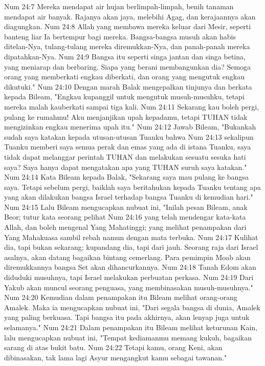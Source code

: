 Num 24:7  Mereka mendapat air hujan berlimpah-limpah, benih tanaman mendapat air banyak. Rajanya akan jaya, melebihi Agag, dan kerajaannya akan diagungkan.
Num 24:8  Allah yang membawa mereka keluar dari Mesir, seperti banteng liar Ia bertempur bagi mereka. Bangsa-bangsa musuh akan habis ditelan-Nya, tulang-tulang mereka diremukkan-Nya, dan panah-panah mereka dipatahkan-Nya.
Num 24:9  Bangsa itu seperti singa jantan dan singa betina, yang meniarap dan berbaring. Siapa yang berani membangunkan dia? Semoga orang yang memberkati engkau diberkati, dan orang yang mengutuk engkau dikutuki."
Num 24:10  Dengan marah Balak mengepalkan tinjunya dan berkata kepada Bileam, "Engkau kupanggil untuk mengutuk musuh-musuhku, tetapi mereka malah kauberkati sampai tiga kali.
Num 24:11  Sekarang kau boleh pergi, pulang ke rumahmu! Aku menjanjikan upah kepadamu, tetapi TUHAN tidak mengizinkan engkau menerima upah itu."
Num 24:12  Jawab Bileam, "Bukankah sudah saya katakan kepada utusan-utusan Tuanku bahwa
Num 24:13  sekalipun Tuanku memberi saya semua perak dan emas yang ada di istana Tuanku, saya tidak dapat melanggar perintah TUHAN dan melakukan sesuatu sesuka hati saya? Saya hanya dapat mengatakan apa yang TUHAN suruh saya katakan."
Num 24:14  Kata Bileam kepada Balak, "Sekarang saya mau pulang ke bangsa saya. Tetapi sebelum pergi, baiklah saya beritahukan kepada Tuanku tentang apa yang akan dilakukan bangsa Israel terhadap bangsa Tuanku di kemudian hari."
Num 24:15  Lalu Bileam mengucapkan nubuat ini, "Inilah pesan Bileam, anak Beor; tutur kata seorang pelihat
Num 24:16  yang telah mendengar kata-kata Allah, dan boleh mengenal Yang Mahatinggi; yang melihat penampakan dari Yang Mahakuasa sambil rebah namun dengan mata terbuka.
Num 24:17  Kulihat dia, tapi bukan sekarang; kupandang dia, tapi dari jauh. Seorang raja dari Israel asalnya, akan datang bagaikan bintang cemerlang. Para pemimpin Moab akan diremukkannya bangsa Set akan dihancurkannya.
Num 24:18  Tanah Edom akan diduduki musuhnya, tapi Israel melakukan perbuatan perkasa.
Num 24:19  Dari Yakub akan muncul seorang penguasa, yang membinasakan musuh-musuhnya."
Num 24:20  Kemudian dalam penampakan itu Bileam melihat orang-orang Amalek. Maka ia mengucapkan nubuat ini, "Dari segala bangsa di dunia, Amalek yang paling berkuasa. Tapi bangsa itu pada akhirnya, akan lenyap juga untuk selamanya."
Num 24:21  Dalam penampakan itu Bileam melihat keturunan Kain, lalu mengucapkan nubuat ini, "Tempat kediamanmu memang kukuh, bagaikan sarang di atas bukit batu.
Num 24:22  Tetapi kamu, orang Keni, akan dibinasakan, tak lama lagi Asyur mengangkut kamu sebagai tawanan."
